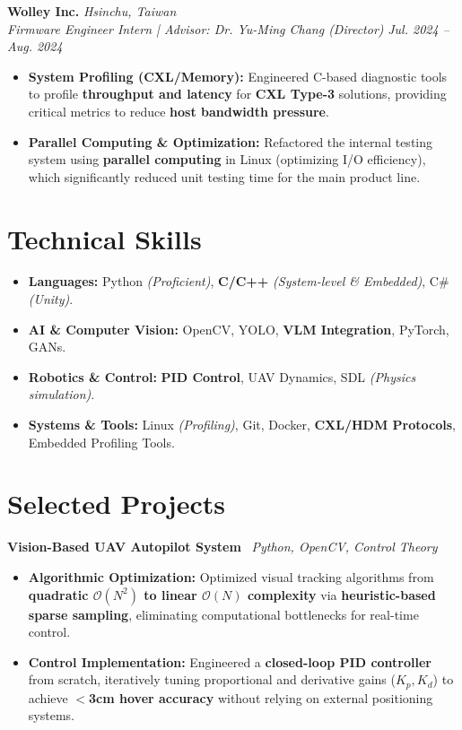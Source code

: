 \documentclass[10pt,letterpaper]{article}
\newenvironment{hangitems}{%
  \begin{itemize}[leftmargin=1.6em,labelsep=0.4em,topsep=2pt,itemsep=2pt,parsep=0pt]
}{%
  \end{itemize}
}
\begin{document}
\noindent
\textbf{Wolley Inc.} \hfill \textit{Hsinchu, Taiwan}\\
\textit{Firmware Engineer Intern | Advisor: Dr. Yu-Ming Chang (Director)} \hfill \textit{Jul. 2024 – Aug. 2024}
\begin{hangitems}
    \item \textbf{System Profiling (CXL/Memory):} Engineered C-based diagnostic tools to profile \textbf{throughput and latency} for \textbf{CXL Type-3} solutions, providing critical metrics to reduce \textbf{host bandwidth pressure}.
    \item \textbf{Parallel Computing \& Optimization:} Refactored the internal testing system using \textbf{parallel computing} in Linux (optimizing I/O efficiency), which significantly reduced unit testing time for the main product line.
\end{hangitems}

\section*{Technical Skills}
\begin{itemize}[leftmargin=1.6em, labelsep=0.4em, topsep=2pt, itemsep=1pt, parsep=0pt]
    \item \textbf{Languages:} Python \textit{(Proficient)}, \textbf{C/C++} \textit{(System-level \& Embedded)}, C\# \textit{(Unity)}.
    \item \textbf{AI \& Computer Vision:} OpenCV, YOLO, \textbf{VLM Integration}, PyTorch, GANs.
    \item \textbf{Robotics \& Control:} \textbf{PID Control}, UAV Dynamics, SDL \textit{(Physics simulation)}.
    \item \textbf{Systems \& Tools:} Linux \textit{(Profiling)}, Git, Docker, \textbf{CXL/HDM Protocols}, Embedded Profiling Tools.
\end{itemize}

\newpage

\section*{Selected Projects}

\noindent
\textbf{Vision-Based UAV Autopilot System} \textbar\ \textit{Python, OpenCV, Control Theory} \href{https://github.com/tommy60718/2023_UAV-CV}{\footnotesize{}}
\begin{hangitems}
    \item \textbf{Algorithmic Optimization:} Optimized visual tracking algorithms from \textbf{quadratic $\mathcal{O}(N^2)$ to linear $\mathcal{O}(N)$ complexity} via \textbf{heuristic-based sparse sampling}, eliminating computational bottlenecks for real-time control.
    \item \textbf{Control Implementation:} Engineered a \textbf{closed-loop PID controller} from scratch, iteratively tuning proportional and derivative gains ($K_p, K_d$) to achieve \textbf{$<$3cm hover accuracy} without relying on external positioning systems.
\end{hangitems}
\end{document}

